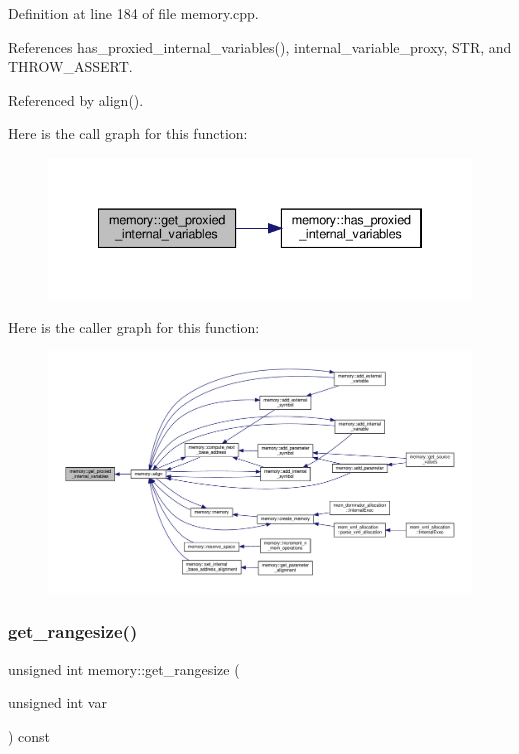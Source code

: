Definition at line 184 of file memory.\+cpp.



References has\+\_\+proxied\+\_\+internal\+\_\+variables(), internal\+\_\+variable\+\_\+proxy, S\+TR, and T\+H\+R\+O\+W\+\_\+\+A\+S\+S\+E\+RT.



Referenced by align().

Here is the call graph for this function\+:
\nopagebreak
\begin{figure}[H]
\begin{center}
\leavevmode
\includegraphics[width=334pt]{d8/d99/classmemory_afa287c1bff2634613e59d7ece4d74d60_cgraph}
\end{center}
\end{figure}
Here is the caller graph for this function\+:
\nopagebreak
\begin{figure}[H]
\begin{center}
\leavevmode
\includegraphics[width=350pt]{d8/d99/classmemory_afa287c1bff2634613e59d7ece4d74d60_icgraph}
\end{center}
\end{figure}
\mbox{\label{classmemory_accb255d35a6b3e1d93b5f38b9459b52b}} 
\subsubsection{\texorpdfstring{get\+\_\+rangesize()}{get\_rangesize()}}
{\footnotesize\ttfamily unsigned int memory\+::get\+\_\+rangesize (\begin{DoxyParamCaption}\item[{unsigned int}]{var }\end{DoxyParamCaption}) const}



